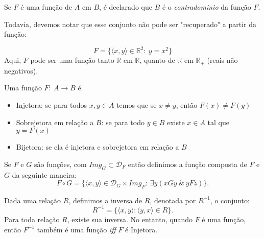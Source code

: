 \begin{definition}[Contradomínio]
  Se $F$ é uma função de $A$ em $B$, é declarado que $B$ é o \textit{contradomínio} da função $F$.  
\end{definition}
Todavia, devemos notar que esse conjunto não pode ser "recuperado" a partir da função:
\begin{exmp}
  $$F = \{\langle x, y \rangle \in \mathbb{R}^{2}:\ y = x^{2}\}$$
  Aqui, $F$ pode ser uma função tanto $\mathbb{R}$ em $\mathbb{R}$, quanto de $\mathbb{R}$ em $\mathbb{R}_{+}$ (reais não negativos).
\end{exmp}
\begin{definition}[Natureza]
  Uma função $F:\ A \longrightarrow B$ é
\end{definition}
\begin{itemize}
  \item Injetora: se para todos $x, y \in A$ temos que se $x \neq y$, então $F(x) \neq F(y)$
  \item Sobrejetora em relação a $B$: se para todo $y \in B$ existe $x \in A$ tal que $y = F(x)$
  \item Bijetora: se ela é injetora e sobrejetora em relação a $B$
\end{itemize}
\begin{definition}[Composta]
  Se $F$ e $G$ são funções, com $\mathit{Img}_{G} \subset \mathcal{D}_{F}$ então definimos a função composta de $F$ e $G$ da seguinte maneira:
  $$ F \circ G = \{\langle x, y \rangle \in \mathcal{D}_{G} \times \mathit{Img}_{F}:\ \exists y (xGy\ \&\ yFz)\}.$$  
\end{definition}

\begin{center}
\end{center}
\begin{definition}[Inversa]
  Dada uma relação $R$, definimos a inversa de $R$, denotada por $R^{-1}$, o conjunto:
  $$R^{-1} = \{\langle x, y \rangle: \langle y, x \rangle \in R\}.$$
  Para toda relação $R$, existe sua inversa. No entanto, quando $F$ é uma função, então $F^{-1}$ também é uma função \textit{iff} $F$ é Injetora.
\end{definition}


